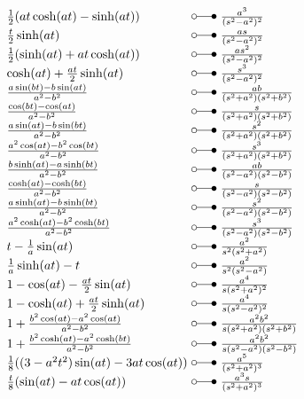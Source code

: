 \[ \begin{array}{@{}l@{ ~ \laplace ~ }l@{}}
\frac{1}{2} (at \cosh(at) - \sinh(at)) &
    \frac{a^3}{(s^2 - a^2)^2} \\
\frac{t}{2} \sinh(at) &
    \frac{as}{(s^2 - a^2)^2} \\
\frac{1}{2} (\sinh(at) + at \cosh(at)) &
    \frac{a s^2}{(s^2 - a^2)^2} \\
\cosh(at) + \frac{at}{2} \sinh(at) &
    \frac{s^3}{(s^2 - a^2)^2} \\
\frac{a \sin(bt) - b \sin(at)}{a^2 - b^2} &
    \frac{ab}{(s^2 + a^2) (s^2 + b^2)} \\
\frac{\cos(bt) - \cos(at)}{a^2 - b^2} &
    \frac{s}{(s^2 + a^2) (s^2 + b^2)} \\
\frac{a \sin(at) - b \sin(bt)}{a^2 - b^2} &
    \frac{s^2}{(s^2 + a^2) (s^2 + b^2)} \\
\frac{a^2 \cos(at) - b^2 \cos(bt)}{a^2 - b^2} &
    \frac{s^3}{(s^2 + a^2) (s^2 + b^2)} \\
\frac{b \sinh(at) - a \sinh(bt)}{a^2 - b^2} &
    \frac{ab}{(s^2 - a^2) (s^2 - b^2)} \\
\frac{\cosh(at) - \cosh(bt)}{a^2 - b^2} &
    \frac{s}{(s^2 - a^2) (s^2 - b^2)} \\
\frac{a \sinh(at) - b \sinh(bt)}{a^2 - b^2} &
    \frac{s^2}{(s^2 - a^2) (s^2 - b^2)} \\
\frac{a^2 \cosh(at) - b^2 \cosh(bt)}{a^2 - b^2} &
    \frac{s^3}{(s^2 - a^2) (s^2 - b^2)} \\
t - \frac{1}{a} \sin(at) &
    \frac{a^2}{s^2 (s^2 + a^2)} \\
\frac{1}{a} \sinh(at) -t &
    \frac{a^2}{s^2(s^2 - a^2)} \\
1 - \cos(at) - \frac{at}{2} \sin(at) &
    \frac{a^4}{s (s^2 + a^2)^2} \\
1 - \cosh(at) + \frac{at}{2} \sinh(at) &
    \frac{a^4}{s (s^2 - a^2)^2} \\
1 + \frac{b^2 \cos(at) - a^2 \cos(at)}{a^2 - b^2} &
    \frac{a^2 b^2}{s (s^2 + a^2) (s^2 + b^2)} \\
1 + \frac{b^2 \cosh(at) - a^2 \cosh(bt)}{a^2 - b^2} &
    \frac{a^2 b^2}{s (s^2 - a^2) (s^2 - b^2)} \\
\frac{1}{8} ((3 - a^2 t^2) \sin(at) - 3 at \cos(at)) &
    \frac{a^5}{(s^2 + a^2)^3} \\
\frac{t}{8} (\sin(at) - at \cos(at)) &
    \frac{a^3 s}{(s^2 + a^2)^3} \\
\end{array} \]

